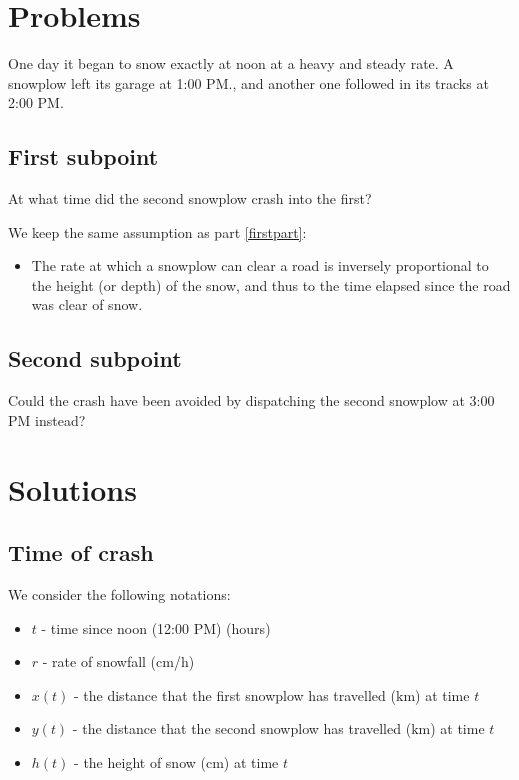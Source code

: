 \documentclass[a4paper,12pt]{article}
\begin{document}
\section{Problems}
\begin{framed}
    One day it began to snow exactly at noon at a heavy and steady rate. A snowplow left its garage at 1:00 PM., and another one followed in its tracks at 2:00 PM.
\end{framed}
    \subsection{First subpoint}
        \begin{framed}
            At what time did the second snowplow crash into the first?
        \end{framed}
        We keep the same assumption as part \ref{firstpart}:
        \begin{itemize}
            \item The rate at which a snowplow can clear a road is inversely proportional to the height (or depth) of the snow, and thus to the time elapsed since the road was clear of snow.
        \end{itemize}
    \subsection{Second subpoint}
        \begin{framed}
            Could the crash have been avoided by dispatching the second snowplow at 3:00 PM instead?
        \end{framed}
\section{Solutions}
    \subsection{Time of crash}
        We consider the following notations:
        \begin{itemize}
            \item $t$ - time since noon (12:00 PM) (hours)
            \item $r$ - rate of snowfall (cm/h)
            \item $x(t)$ - the distance that the first snowplow has travelled ($\unit{\kilo\meter}$) at time $t$
            \item $y(t)$ - the distance that the second snowplow has travelled ($\unit{\kilo\meter}$) at time $t$
            \item $h(t)$ - the height of snow ($\unit{\centi\meter}$) at time $t$
        \end{itemize}
\end{document}
